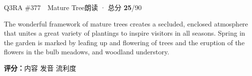 \begin{qblock}{Q3\quad RA \#377\ \ Mature Tree}{朗读 · 总分 \textcolor{cAccent}{\bfseries 25}/90}
\begin{promptbox}
The wonderful framework of mature trees creates a secluded, enclosed atmosphere that unites a great variety of plantings to inspire visitors in all seasons. Spring in the garden is marked by leafing up and flowering of trees and the eruption of the flowers in the bulb meadows, and woodland understory.
\end{promptbox}
\asrlegend
\begin{asrbox}
         \pse {}     \pse {}   \pse {}              \pse {}     \pse {}           \pse {}   \pse {}
\end{asrbox}
\smallskip
{\small\textbf{评分：}内容  \quad\textperiodcentered\quad 发音  \quad\textperiodcentered\quad 流利度 }
\end{qblock}

